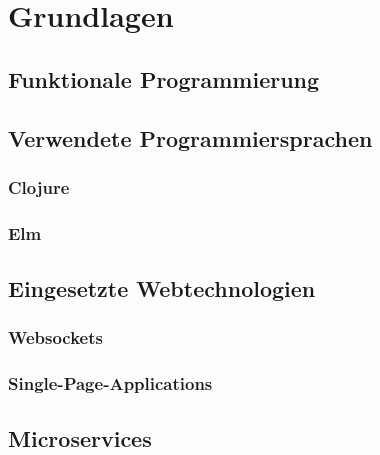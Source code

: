 \chapter{Grundlagen}
\section{Funktionale Programmierung}
\section{Verwendete Programmiersprachen}
\subsection{Clojure}
\subsection{Elm}
\section{Eingesetzte Webtechnologien}
\subsection{Websockets}
\subsection{Single-Page-Applications}
\section{Microservices}
